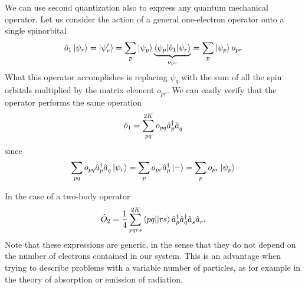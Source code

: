 \documentclass[../Main/chem532-notes.tex]{subfiles}
\begin{document}
We can use second quantization also to express any quantum mechanical operator.
Let us consider the action of a general one-electron operator onto a single spinorbital
\begin{equation}
\hat{o}_1 \ket{\psi_r} = \ket{\psi'_r} = \sum_p \ket{\psi_p} \underbrace{\braket{\psi_p | \hat{o}_1 | \psi_r}}_{o_{pr}} = \sum_p \ket{\psi_p} o_{pr}
\end{equation}
What this operator accomplishes is replacing $\psi_q$ with the sum of all the spin orbitals multiplied by the matrix element $o_{pr}$.
We can easily verify that the operator performs the same operation
\begin{equation}
\hat{o}_1 = \sum_{pq}^{2K} o_{pq} \hat{a}_{p}^{\dagger} \hat{a}_{q}^{\,}
\end{equation}
since
\begin{equation}
\sum_{pq} o_{pq} \hat{a}_{p}^{\dagger} \hat{a}_{q}^{\,} \ket{\psi_r} = \sum_{p} o_{pr} \hat{a}_{p}^{\dagger} \ket{-} = \sum_{p} o_{pr} \ket{\psi_p}
\end{equation}

In the case of a two-body operator
\begin{equation}
\hat{O}_2 = \frac{1}{4} \sum_{pqrs}^{2K} \bra{pq}\!\ket{rs} \hat{a}_{p}^{\dagger}\hat{a}_{q}^{\dagger}\hat{a}_{s}^{\,}\hat{a}_{r}^{\,}.
\end{equation}
Note that these expressions are generic, in the sense that they do not depend on the number of electrons contained in our system. This is an advantage when trying to describe problems with a variable number of particles, as for example in the theory of absorption or emission of radiation.
\end{document}
